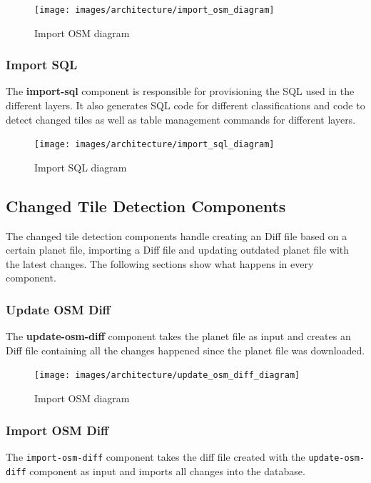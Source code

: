 \begin{figure}[H]
  \centering
  \texttt{[image: images/architecture/import\_osm\_diagram]}
  \caption{Import OSM diagram}
\end{figure}

\subsubsection{Import SQL}

The \textbf{import-sql} component is responsible for provisioning the SQL used in the different layers. It also generates SQL code for different classifications and code to detect changed tiles as well as table management commands for different layers.

\begin{figure}[H]
  \centering
  \texttt{[image: images/architecture/import\_sql\_diagram]}
  \caption{Import SQL diagram}
\end{figure}

\subsection{Changed Tile Detection Components}

The changed tile detection components handle creating an \osm{} Diff file based on a certain \osm{} planet file, importing a \osm{} Diff file and updating outdated \osm{} planet file with the latest changes. The following sections show what happens in every component.

\subsubsection{Update OSM Diff}

The \textbf{update-osm-diff} component takes the planet file as input and creates an \osm{} Diff file containing all the changes happened since the planet file was downloaded.

\begin{figure}[H]
  \centering
  \texttt{[image: images/architecture/update\_osm\_diff\_diagram]}
  \caption{Import OSM diagram}
\end{figure}

\subsubsection{Import OSM Diff}

The \texttt{import-osm-diff} component takes the \osm{} diff file created with the \texttt{update-osm-diff} component as input and imports all changes into the database.

